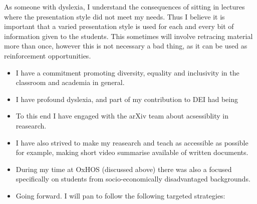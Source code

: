 \documentclass[14pt,letter]{article}
\newcounter{customtitle}
\begin{document}
 
 As someone with dyslexia, I understand
 the consequences of sitting in lectures  where the presentation 
style did not meet my needs. Thus I believe it is important that a varied presentation 
style is used for each and every bit of information given to the students. 
This sometimes will involve retracing material more than once, however this 
is not necessary a bad thing, as it can be used as reinforcement opportunities. 

 
\begin{itemize}
\item I have a commitment promoting diversity, equality and inclusivity 
in the classroom and academia in general. 
\item I have profound dyslexia, and part of my contribution to DEI 
	had being 
\item To this end I have engaged with the arXiv team about acsessiblity 
in reasearch. 
\item I have also strived to make my reasearch and teach as accessible as possible
for example, making short video summarise available of written documents. 
\item During my time at OxHOS (discussed above) there was also a focused 
specifically on students from socio-economically disadvantaged backgrounds. 
\item Going forward. I will pan to follow the following targeted strategies: 
\end{itemize} 



\end{document}

